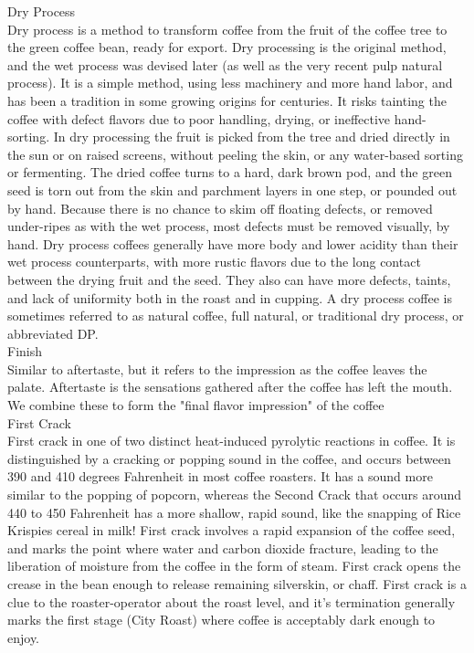 \documentclass[10pt,twoside,footinclude=true,headinclude=true]{scrbook} %
\begin{document}
\begin{multicols}{2}
\medskip
{\smallcaps \small Dry Process}\\
Dry process is a method to transform coffee from the fruit of the coffee tree to the green coffee bean, ready for export. Dry processing is the original method, and the wet process was devised later (as well as the very recent pulp natural process). It is a simple method, using less machinery and more hand labor, and has been a tradition in some growing origins for centuries. It risks tainting the coffee with defect flavors due to poor handling, drying, or ineffective hand-sorting. In dry processing the fruit is picked from the tree and dried directly in the sun or on raised screens, without peeling the skin, or any water-based sorting or fermenting. The dried coffee turns to a hard, dark brown pod, and the green seed is torn out from the skin and parchment layers in one step, or pounded out by hand. Because there is no chance to skim off floating defects, or removed under-ripes as with the wet process, most defects must be removed visually, by hand. Dry process coffees generally have more body and lower acidity than their wet process counterparts, with more rustic flavors due to the long contact between the drying fruit and the seed. They also can have more defects, taints, and lack of uniformity both in the roast and in cupping. A dry process coffee is sometimes referred to as natural coffee, full natural, or traditional dry process, or abbreviated DP.\\
\medskip
{\smallcaps \small Finish}\\
Similar to aftertaste, but it refers to the impression as the coffee leaves the palate. Aftertaste is the sensations gathered after the coffee has left the mouth. We combine these to form the "final flavor impression" of the coffee\\
\medskip
{\smallcaps \small First Crack}\\
First crack in one of two distinct heat-induced pyrolytic reactions in coffee. It is distinguished by a cracking or popping sound in the coffee, and occurs between 390 and 410 degrees Fahrenheit in most coffee roasters. It has a sound more similar to the popping of popcorn, whereas the Second Crack that occurs around 440 to 450 Fahrenheit has a more shallow, rapid sound, like the snapping of Rice Krispies cereal in milk! First crack involves a rapid expansion of the coffee seed, and marks the point where water and carbon dioxide fracture, leading to the liberation of moisture from the coffee in the form of steam. First crack opens the crease in the bean enough to release remaining silverskin, or chaff. First crack is a clue to the roaster-operator about the roast level, and it's termination generally marks the first stage (City Roast) where coffee is acceptably dark enough to enjoy.\\

\end{multicols}
\end{document}
